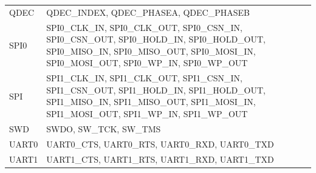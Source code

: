 \documentclass[
  12pt,
]{book}
\begin{document}
\begin{longtable}[]{@{}ll@{}}
\begin{minipage}[t]{0.09\columnwidth}
QDEC\strut
\end{minipage} & \begin{minipage}[t]{0.85\columnwidth}\raggedright
QDEC\_INDEX, QDEC\_PHASEA, QDEC\_PHASEB\strut
\end{minipage}\tabularnewline
\begin{minipage}[t]{0.09\columnwidth}\raggedright
SPI0\strut
\end{minipage} & \begin{minipage}[t]{0.85\columnwidth}\raggedright
SPI0\_CLK\_IN, SPI0\_CLK\_OUT, SPI0\_CSN\_IN, SPI0\_CSN\_OUT, SPI0\_HOLD\_IN, SPI0\_HOLD\_OUT, SPI0\_MISO\_IN, SPI0\_MISO\_OUT, SPI0\_MOSI\_IN, SPI0\_MOSI\_OUT, SPI0\_WP\_IN, SPI0\_WP\_OUT\strut
\end{minipage}\tabularnewline
\begin{minipage}[t]{0.09\columnwidth}\raggedright
SPI\strut
\end{minipage} & \begin{minipage}[t]{0.85\columnwidth}\raggedright
SPI1\_CLK\_IN, SPI1\_CLK\_OUT, SPI1\_CSN\_IN, SPI1\_CSN\_OUT, SPI1\_HOLD\_IN, SPI1\_HOLD\_OUT, SPI1\_MISO\_IN, SPI1\_MISO\_OUT, SPI1\_MOSI\_IN, SPI1\_MOSI\_OUT, SPI1\_WP\_IN, SPI1\_WP\_OUT\strut
\end{minipage}\tabularnewline
\begin{minipage}[t]{0.09\columnwidth}\raggedright
SWD\strut
\end{minipage} & \begin{minipage}[t]{0.85\columnwidth}\raggedright
SWDO, SW\_TCK, SW\_TMS\strut
\end{minipage}\tabularnewline
\begin{minipage}[t]{0.09\columnwidth}\raggedright
UART0\strut
\end{minipage} & \begin{minipage}[t]{0.85\columnwidth}\raggedright
UART0\_CTS, UART0\_RTS, UART0\_RXD, UART0\_TXD\strut
\end{minipage}\tabularnewline
\begin{minipage}[t]{0.09\columnwidth}\raggedright
UART1\strut
\end{minipage} & \begin{minipage}[t]{0.85\columnwidth}\raggedright
UART1\_CTS, UART1\_RTS, UART1\_RXD, UART1\_TXD\strut
\end{minipage}\tabularnewline
\bottomrule
\end{longtable}
\end{document}
